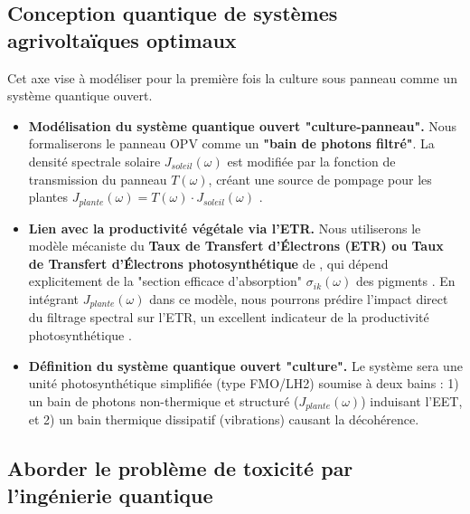\documentclass[12pt, a4paper]{article}
\begin{document}
\subsection{Conception quantique de systèmes agrivoltaïques optimaux}

Cet axe vise à modéliser pour la première fois la culture sous panneau comme un système quantique ouvert.
\begin{itemize}
    \item \textbf{Modélisation du système quantique ouvert "culture-panneau".} Nous formaliserons le panneau OPV comme un \textbf{"bain de photons filtré"}. La densité spectrale solaire $J_{soleil}(\omega)$ est modifiée par la fonction de transmission du panneau $T(\omega)$, créant une source de pompage pour les plantes $J_{plante}(\omega) = T(\omega) \cdot J_{soleil}(\omega)$ \cite{Gong2024, Shi2025a}.

    \item \textbf{Lien avec la productivité végétale via l'ETR.} Nous utiliserons le modèle mécaniste du \textbf{Taux de Transfert d'Électrons (ETR) ou Taux de Transfert d'Électrons photosynthétique} de \cite{ye2012}, qui dépend explicitement de la "section efficace d'absorption" $\sigma_{ik}(\omega)$ des pigments \cite{ye2012}. En intégrant $J_{plante}(\omega)$ dans ce modèle, nous pourrons prédire l'impact direct du filtrage spectral sur l'ETR, un excellent indicateur de la productivité photosynthétique \cite{ye2012}.

    \item \textbf{Définition du système quantique ouvert "culture".} Le système sera une unité photosynthétique simplifiée (type FMO/LH2) soumise à deux bains : 1) un bain de photons non-thermique et structuré ($J_{plante}(\omega)$) induisant l'EET, et 2) un bain thermique dissipatif (vibrations) causant la décohérence.
\end{itemize}

\subsection{Aborder le problème de toxicité par l'ingénierie quantique}
\end{document}
